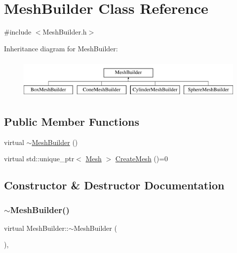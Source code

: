 \hypertarget{class_mesh_builder}{}\section{Mesh\+Builder Class Reference}
\label{class_mesh_builder}


{\ttfamily \#include $<$Mesh\+Builder.\+h$>$}

Inheritance diagram for Mesh\+Builder\+:\begin{figure}[H]
\begin{center}
\leavevmode
\includegraphics[height=2.000000cm]{class_mesh_builder}
\end{center}
\end{figure}
\subsection*{Public Member Functions}
\begin{DoxyCompactItemize}
\item 
virtual \mbox{\hyperlink{class_mesh_builder_a0ca7377cf981c1c2996f2f6dbc588352}{$\sim$\+Mesh\+Builder}} ()
\item 
virtual std\+::unique\+\_\+ptr$<$ \mbox{\hyperlink{class_mesh}{Mesh}} $>$ \mbox{\hyperlink{class_mesh_builder_a41cfd23b93c25bc016c889c2c67a2637}{Create\+Mesh}} ()=0
\end{DoxyCompactItemize}


\subsection{Constructor \& Destructor Documentation}
\mbox{\label{class_mesh_builder_a0ca7377cf981c1c2996f2f6dbc588352}} 
\subsubsection{\texorpdfstring{$\sim$MeshBuilder()}{~MeshBuilder()}}
{\footnotesize\ttfamily virtual Mesh\+Builder\+::$\sim$\+Mesh\+Builder (\begin{DoxyParamCaption}{ }\end{DoxyParamCaption})\hspace{0.3cm}{\ttfamily [inline]}, {\ttfamily [virtual]}}



